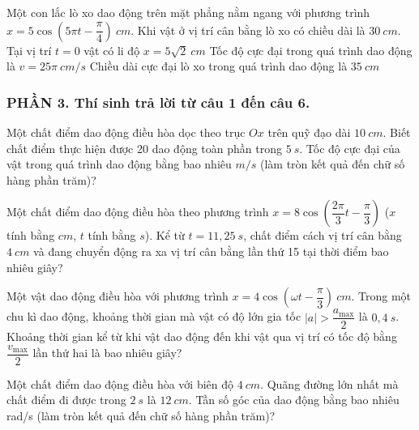 \begin{ex}
	Một con lắc lò xo dao động trên mặt phẳng nằm ngang với phương trình $x=5 \cos \left(5 \pi t-\dfrac{\pi}{4}\right)\ cm$. Khi vật ở vị trí cân bằng lò xo có chiều dài là $30 \ cm$.
	{Tại vị trí $t=0$ vật có li độ $x=5 \sqrt{2}\ cm$}
	{\True Tốc độ cực đại trong quá trình dao động là $v=25 \pi\ cm/s$}
	{\True Chiều dài cực đại lò xo trong quá trình dao động là $35 \ cm$}
\end{ex}
\subsubsection*{PHẦN 3. Thí sinh trả lời từ câu 1 đến câu 6.}
\setcounter{ex}{0}
\begin{ex}
	Một chất điểm dao động điều hòa dọc theo trục $O x$ trên quỹ đạo dài $10 \ cm$. Biết chất điểm thực hiện được 20 dao động toàn phần trong $5 \ s$. Tốc độ cực đại của vật trong quá trình dao động bằng bao nhiêu $m/s$ (làm tròn kết quả đến chữ số hàng phần trăm)?
\end{ex}
\begin{ex}
	Một chất điểm dao động điều hòa theo phương trình $x=8 \cos \left(\dfrac{2 \pi}{3} t-\dfrac{\pi}{3}\right)$ ($x$ tính bằng $cm$, $t$ tính bằng $s$). Kể từ $t=11,25 \ s$, chất điểm cách vị trí cân bằng $4 \ cm$ và đang chuyển động ra xa vị trí cân bằng lần thứ 15 tại thời điểm bao nhiêu giây?
	 
\end{ex}
\begin{ex}
	Một vật dao động điều hòa với phương trình $x=4 \cos (\omega t-\dfrac{\pi}{3})\ cm$. Trong một chu kì dao động, khoảng thời gian mà vật có độ lớn gia tốc $\left|a\right|>\dfrac{a_{\max}}{2}$ là $0,4 \ s$. Khoảng thời gian kể từ khi vật dao động đến khi vật qua vị trí có tốc độ bằng $\dfrac{v_{\max}}{2}$ lần thứ hai là bao nhiêu giây?
\end{ex}
\begin{ex}
	Một chất điểm dao động điều hòa với biên độ $4 \ cm$. Quãng đường lớn nhất mà chất điểm đi được trong $2 \ s$ là $12 \ cm$. Tần số góc của dao động bằng bao nhiêu rad/s (làm tròn kết quả đến chữ số hàng phần trăm)?
\end{ex}
